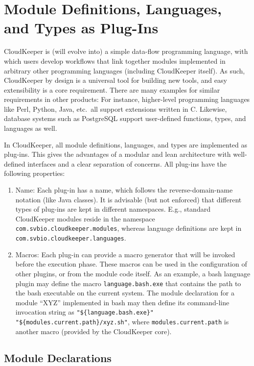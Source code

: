 \section{Module Definitions, Languages, and Types as Plug-Ins}

CloudKeeper is (will evolve into) a simple data-flow programming language, with which users develop workflows that link together modules implemented in arbitrary other programming languages (including CloudKeeper itself). As such, CloudKeeper by design is a universal tool for building new tools, and easy extensibility is a core requirement. There are many examples for similar requirements in other products: For instance, higher-level programming languages like Perl, Python, Java, etc.\ all support extensions written in C. Likewise, database systems such as PostgreSQL support user-defined functions, types, and languages as well.

In CloudKeeper, all module definitions, languages, and types are implemented as plug-ins. This gives the advantages of a modular and lean architecture with well-defined interfaces and a clear separation of concerns. All plug-ins have the following properties:
%
\begin{enumerate}
	\item Name: Each plug-in has a name, which follows the reverse-domain-name notation (like Java classes). It is advisable (but not enforced) that different types of plug-ins are kept in different namespaces. E.g., standard CloudKeeper modules reside in the namespace \texttt{com.svbio.cloudkeeper.modules}, whereas language definitions are kept in \texttt{com.svbio.cloudkeeper.languages}.

	\item Macros: Each plug-in can provide a macro generator that will be invoked before the execution phase. These macros can be used in the configuration of other plugins, or from the module code itself. As an example, a bash language plugin may define the macro \texttt{language.bash.exe} that contains the path to the bash executable on the current system. The module declaration for a module ``XYZ'' implemented in bash may then define its command-line invocation string as \texttt{"\$\{language.bash.exe\}" "\$\{modules.current.path\}/xyz.sh"}, where \texttt{modules.current.path} is another macro (provided by the CloudKeeper core).
\end{enumerate}

\subsection{Module Declarations}

